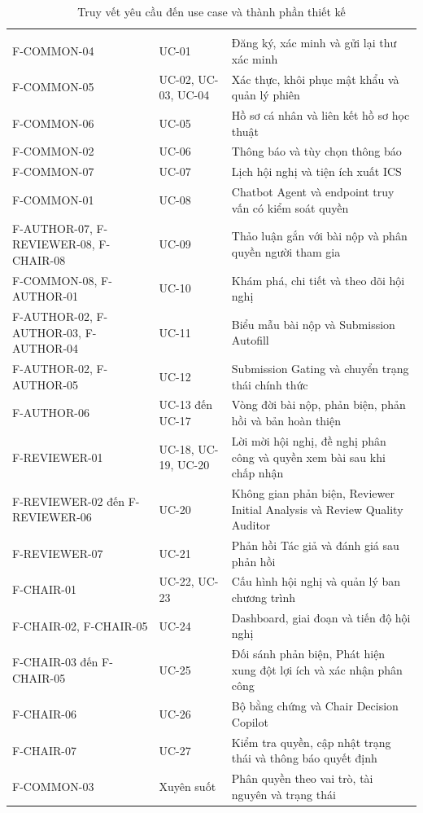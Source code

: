 \begingroup
\setlength{\tabcolsep}{2pt}
\begin{longtable}{|T{0.25\textwidth}|T{0.2\textwidth}|T{0.45\textwidth}|}
\caption{Truy vết yêu cầu đến use case và thành phần thiết kế}\label{tab:ch3-demo-requirement-trace}\\
\hline
{} &  &  \\ \hline
\endfirsthead
\hline
{} &  &  \\ \hline
\endhead
F-COMMON-04 & UC-01 & Đăng ký, xác minh và gửi lại thư xác minh \\ \hline
F-COMMON-05 & UC-02, UC-03, UC-04 & Xác thực, khôi phục mật khẩu và quản lý phiên \\ \hline
F-COMMON-06 & UC-05 & Hồ sơ cá nhân và liên kết hồ sơ học thuật \\ \hline
F-COMMON-02 & UC-06 & Thông báo và tùy chọn thông báo \\ \hline
F-COMMON-07 & UC-07 & Lịch hội nghị và tiện ích xuất ICS \\ \hline
F-COMMON-01 & UC-08 & Chatbot Agent và endpoint truy vấn có kiểm soát quyền \\ \hline
F-AUTHOR-07, F-REVIEWER-08, F-CHAIR-08 & UC-09 & Thảo luận gắn với bài nộp và phân quyền người tham gia \\ \hline
F-COMMON-08, F-AUTHOR-01 & UC-10 & Khám phá, chi tiết và theo dõi hội nghị \\ \hline
F-AUTHOR-02, F-AUTHOR-03, F-AUTHOR-04 & UC-11 & Biểu mẫu bài nộp và Submission Autofill \\ \hline
F-AUTHOR-02, F-AUTHOR-05 & UC-12 & Submission Gating và chuyển trạng thái chính thức \\ \hline
F-AUTHOR-06 & UC-13 đến UC-17 & Vòng đời bài nộp, phản biện, phản hồi và bản hoàn thiện \\ \hline
F-REVIEWER-01 & UC-18, UC-19, UC-20 & Lời mời hội nghị, đề nghị phân công và quyền xem bài sau khi chấp nhận \\ \hline
F-REVIEWER-02 đến F-REVIEWER-06 & UC-20 & Không gian phản biện, Reviewer Initial Analysis và Review Quality Auditor \\ \hline
F-REVIEWER-07 & UC-21 & Phản hồi Tác giả và đánh giá sau phản hồi \\ \hline
F-CHAIR-01 & UC-22, UC-23 & Cấu hình hội nghị và quản lý ban chương trình \\ \hline
F-CHAIR-02, F-CHAIR-05 & UC-24 & Dashboard, giai đoạn và tiến độ hội nghị \\ \hline
F-CHAIR-03 đến F-CHAIR-05 & UC-25 & Đối sánh phản biện, Phát hiện xung đột lợi ích và xác nhận phân công \\ \hline
F-CHAIR-06 & UC-26 & Bộ bằng chứng và Chair Decision Copilot \\ \hline
F-CHAIR-07 & UC-27 & Kiểm tra quyền, cập nhật trạng thái và thông báo quyết định \\ \hline
F-COMMON-03 & Xuyên suốt & Phân quyền theo vai trò, tài nguyên và trạng thái \\ \hline
\end{longtable}
\endgroup


